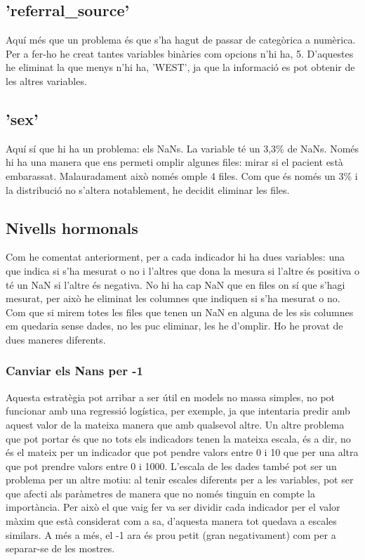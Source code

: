 \documentclass[9pt,a4paper,twoside]{tau-class/tau}
\begin{document}
    \subsection{'referral\_source'}
    Aquí més que un problema és que s'ha hagut de passar de categòrica a numèrica. Per a fer-ho he creat tantes variables binàries com opcions n'hi ha, 5. D'aquestes he eliminat la que menys n'hi ha, 'WEST', ja que la informació es pot obtenir de les altres variables.

    \subsection{'sex'}
    Aquí sí que hi ha un problema: els NaNs. La variable té un 3,3\% de NaNs. Només hi ha una manera que ens permeti omplir algunes files: mirar si el pacient està embarassat. Malauradament això només omple 4 files. Com que és només un 3\% i la distribució no s'altera notablement, he decidit eliminar les files.

    \subsection{Nivells hormonals}
    Com he comentat anteriorment, per a cada indicador hi ha dues variables: una que indica si s'ha mesurat o no i l'altres que dona la mesura si l'altre és positiva o té un NaN si l'altre és negativa. No hi ha cap NaN que en files on sí que s'hagi mesurat, per això he eliminat les columnes que indiquen si s'ha mesurat o no. Com que si mirem totes les files que tenen un NaN en alguna de les sis columnes em quedaria sense dades, no les puc eliminar, les he d'omplir. Ho he provat de dues maneres diferents.

    \subsubsection{Canviar els Nans per -1}
    Aquesta estratègia pot arribar a ser útil en models no massa simples, no pot funcionar amb una regressió logística, per exemple, ja que intentaria predir amb aquest valor de la mateixa manera que amb qualsevol altre. Un altre problema que pot portar és que no tots els indicadors tenen la mateixa escala, és a dir, no és el mateix per un indicador que pot pendre valors entre 0 i 10 que per una altra que pot prendre valors entre 0 i 1000. L'escala de les dades també pot ser un problema per un altre motiu: al tenir escales diferents per a les variables, pot ser que afecti als paràmetres de manera que no només tinguin en compte la importància. Per això el que vaig fer va ser dividir cada indicador per el valor màxim que està considerat com a sa, d'aquesta manera tot quedava a escales similars. A més a més, el -1 ara és prou petit (gran negativament) com per a separar-se de les mostres.
\end{document}
